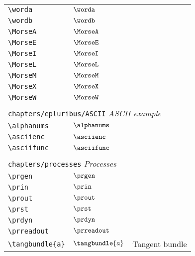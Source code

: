 \begin{longtable}{lll}
 {\color[rgb]{0.5,0.5,0.5}\texttt{\textbackslash worda}} & $\worda$ & \\ 
 {\color[rgb]{0.5,0.5,0.5}\texttt{\textbackslash wordb}} & $\wordb$ & \\ 
 {\color[rgb]{0.5,0.5,0.5}\texttt{\textbackslash MorseA}} & $\MorseA$ & \\ 
 {\color[rgb]{0.5,0.5,0.5}\texttt{\textbackslash MorseE}} & $\MorseE$ & \\ 
 {\color[rgb]{0.5,0.5,0.5}\texttt{\textbackslash MorseI}} & $\MorseI$ & \\ 
 {\color[rgb]{0.5,0.5,0.5}\texttt{\textbackslash MorseL}} & $\MorseL$ & \\ 
 {\color[rgb]{0.5,0.5,0.5}\texttt{\textbackslash MorseM}} & $\MorseM$ & \\ 
 {\color[rgb]{0.5,0.5,0.5}\texttt{\textbackslash MorseX}} & $\MorseX$ & \\ 
 {\color[rgb]{0.5,0.5,0.5}\texttt{\textbackslash MorseW}} & $\MorseW$ & \\ 
  &  & \\ 
 \multicolumn{3}{l}{{\color[rgb]{0.5,0.5,0.5}\texttt{chapters/epluribus/ASCII}} \emph{ASCII example}}\\ 
 \hline
{\color[rgb]{0.5,0.5,0.5}\texttt{\textbackslash alphanums}} & $\alphanums$ & \\ 
 {\color[rgb]{0.5,0.5,0.5}\texttt{\textbackslash asciienc}} & $\asciienc$ & \\ 
 {\color[rgb]{0.5,0.5,0.5}\texttt{\textbackslash asciifunc}} & $\asciifunc$ & \\ 
  &  & \\ 
 \multicolumn{3}{l}{{\color[rgb]{0.5,0.5,0.5}\texttt{chapters/processes}} \emph{Processes}}\\ 
 \hline
{\color[rgb]{0.5,0.5,0.5}\texttt{\textbackslash prgen}} & $\prgen$ & \\ 
 {\color[rgb]{0.5,0.5,0.5}\texttt{\textbackslash prin}} & $\prin$ & \\ 
 {\color[rgb]{0.5,0.5,0.5}\texttt{\textbackslash prout}} & $\prout$ & \\ 
 {\color[rgb]{0.5,0.5,0.5}\texttt{\textbackslash prst}} & $\prst$ & \\ 
 {\color[rgb]{0.5,0.5,0.5}\texttt{\textbackslash prdyn}} & $\prdyn$ & \\ 
 {\color[rgb]{0.5,0.5,0.5}\texttt{\textbackslash prreadout}} & $\prreadout$ & \\ 
 {\color[rgb]{0.5,0.5,0.5}\texttt{\textbackslash tangbundle\{a\}}} & $\tangbundle{a}$ &  Tangent bundle\\ 

\end{longtable}
